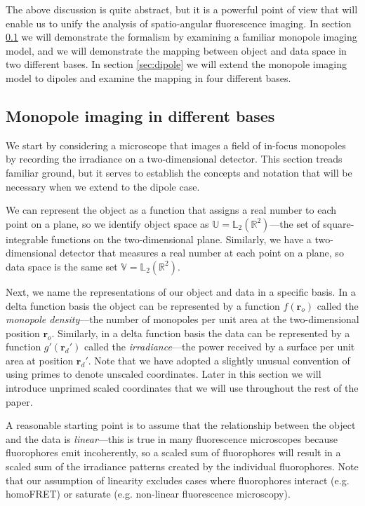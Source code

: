 \documentclass[]{osa-article}
\providecommand{\ro}{\mathbf{\mathbf{r}}_o}
\providecommand{\rd}{\mathbf{r}_d}
\providecommand{\mbb}[1]{\mathbb{#1}}
\begin{document}
The above discussion is quite abstract, but it is a powerful point of view that
will enable us to unify the analysis of spatio-angular fluorescence imaging.
In section \ref{sec:monopole} we will demonstrate the formalism by examining a
familiar monopole imaging model, and we will demonstrate the mapping between
object and data space in two different bases. In section \ref{sec:dipole} we
will extend the monopole imaging model to dipoles and examine the mapping in
four different bases.

\subsection{Monopole imaging in different bases}\label{sec:monopole}
We start by considering a microscope that images a field of in-focus monopoles
by recording the irradiance on a two-dimensional detector. This section treads
familiar ground, but it serves to establish the concepts and notation that will
be necessary when we extend to the dipole case.

We can represent the object as a function that assigns a real number to each
point on a plane, so we identify object space as
$\mbb{U} = \mbb{L}_2(\mbb{R}^2)$---the set of square-integrable functions on the
two-dimensional plane. Similarly, we have a two-dimensional detector that
measures a real number at each point on a plane, so data space is the same set
$\mbb{V} = \mbb{L}_2(\mbb{R}^2)$.

Next, we name the representations of our object and data in a specific basis. In
a delta function basis the object can be represented by a function $f(\ro)$
called the \textit{monopole density}---the number of monopoles per unit area at
the two-dimensional position $\ro$. Similarly, in a delta function basis the
data can be represented by a function $g'(\rd')$ called the
\textit{irradiance}---the power received by a surface per unit area at position
$\rd'$. Note that we have adopted a slightly unusual convention of using primes
to denote unscaled coordinates. Later in this section we will introduce unprimed
scaled coordinates that we will use throughout the rest of the
paper.

A reasonable starting point is to assume that the relationship between the
object and the data is \textit{linear}---this is true in many fluorescence
microscopes because fluorophores emit incoherently, so a scaled sum of
fluorophores will result in a scaled sum of the irradiance patterns created by
the individual fluorophores. Note that our assumption of linearity excludes
cases where fluorophores interact (e.g. homoFRET) or saturate (e.g. non-linear
fluorescence microscopy).
\end{document}
